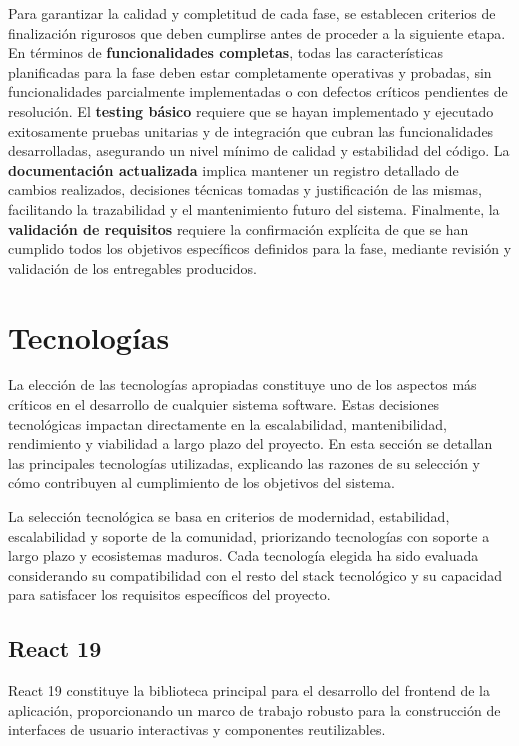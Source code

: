 \documentclass[12pt,a4paper,oneside]{report}
\begin{document}
Para garantizar la calidad y completitud de cada fase, se establecen criterios de finalización rigurosos que deben cumplirse antes de proceder a la siguiente etapa. En términos de \textbf{funcionalidades completas}, todas las características planificadas para la fase deben estar completamente operativas y probadas, sin funcionalidades parcialmente implementadas o con defectos críticos pendientes de resolución. El \textbf{testing básico} requiere que se hayan implementado y ejecutado exitosamente pruebas unitarias y de integración que cubran las funcionalidades desarrolladas, asegurando un nivel mínimo de calidad y estabilidad del código. La \textbf{documentación actualizada} implica mantener un registro detallado de cambios realizados, decisiones técnicas tomadas y justificación de las mismas, facilitando la trazabilidad y el mantenimiento futuro del sistema. Finalmente, la \textbf{validación de requisitos} requiere la confirmación explícita de que se han cumplido todos los objetivos específicos definidos para la fase, mediante revisión y validación de los entregables producidos.

\section{Tecnologías}\label{tecnologuxedas}

La elección de las tecnologías apropiadas constituye uno de los aspectos
más críticos en el desarrollo de cualquier sistema software. Estas
decisiones tecnológicas impactan directamente en la escalabilidad,
mantenibilidad, rendimiento y viabilidad a largo plazo del proyecto. En
esta sección se detallan las principales tecnologías utilizadas,
explicando las razones de su selección y cómo contribuyen al
cumplimiento de los objetivos del sistema.

La selección tecnológica se basa en criterios de modernidad,
estabilidad, escalabilidad y soporte de la comunidad, priorizando
tecnologías con soporte a largo plazo y ecosistemas maduros. Cada
tecnología elegida ha sido evaluada considerando su compatibilidad con
el resto del stack tecnológico y su capacidad para satisfacer los
requisitos específicos del proyecto.

\subsection{React 19}\label{react-19}

React 19 constituye la biblioteca principal para el desarrollo del
frontend de la aplicación, proporcionando un marco de trabajo robusto
para la construcción de interfaces de usuario interactivas y componentes
reutilizables.
\end{document}
